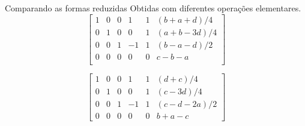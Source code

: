 \documentclass{beamer}
\begin{document}
\begin{frame}{Comparando as formas reduzidas}
  Obtidas com diferentes operações elementares.
  $$
  \left[ \begin{array}{ccccc|c}
     1 & 0 & 0 & 1 & 1 & (b+a+d)/4 \\ 
     0 & 1 & 0 &0 & 1 & (a+b-3d)/4 \\
     0 & 0 & 1 & -1 & 1 & (b - a -d)/2 \\
     0 & 0 & 0 & 0 & 0 & c-b-a \\
    \end{array}\right]
  $$ 

 $$
  \left[ \begin{array}{ccccc|c}
     1 & 0 & 0 & 1 & 1 & (d+c)/4 \\ 
     0 & 1 & 0 & 0 & 1 & (c-3d)/4\\
    0 & 0 & 1 & -1 & 1 & (c -d-2a)/2 \\
     0 & 0 & 0 &0 & 0 & b +a -c 
  \end{array}\right]$$
\end{frame}
   
\end{document}
